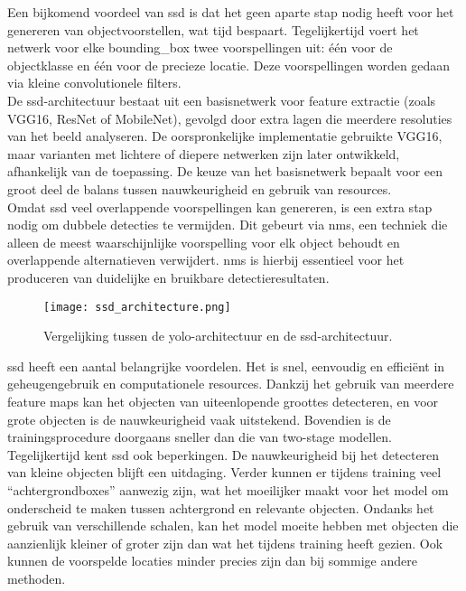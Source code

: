 Een bijkomend voordeel van \gls{ssd} is dat het geen aparte stap nodig heeft voor het genereren van objectvoorstellen, wat tijd bespaart. Tegelijkertijd voert het netwerk voor elke \gls{bounding_box} twee voorspellingen uit: één voor de objectklasse en één voor de precieze locatie. Deze voorspellingen worden gedaan via kleine convolutionele filters. \\

De \gls{ssd}-architectuur bestaat uit een basisnetwerk voor feature extractie (zoals VGG16, ResNet of MobileNet), gevolgd door extra lagen die meerdere resoluties van het beeld analyseren. De oorspronkelijke implementatie gebruikte VGG16, maar varianten met lichtere of diepere netwerken zijn later ontwikkeld, afhankelijk van de toepassing. De keuze van het basisnetwerk bepaalt voor een groot deel de balans tussen nauwkeurigheid en gebruik van resources. \\

Omdat \gls{ssd} veel overlappende voorspellingen kan genereren, is een extra stap nodig om dubbele detecties te vermijden. Dit gebeurt via \gls{nms}, een techniek die alleen de meest waarschijnlijke voorspelling voor elk object behoudt en overlappende alternatieven verwijdert. \gls{nms} is hierbij essentieel voor het produceren van duidelijke en bruikbare detectieresultaten.

\begin{figure}[H]
    \centering
    \texttt{[image: ssd\_architecture.png]}
    \caption[Vergelijking YOLO- en SSD-architectuur.]{\label{fig:ssd_architecture}Vergelijking tussen de \gls{yolo}-architectuur en de \gls{ssd}-architectuur. \autocite{Liu_2016}}
\end{figure}

\gls{ssd} heeft een aantal belangrijke voordelen. Het is snel, eenvoudig en efficiënt in geheugengebruik en computationele resources. Dankzij het gebruik van meerdere feature maps kan het objecten van uiteenlopende groottes detecteren, en voor grote objecten is de nauwkeurigheid vaak uitstekend. Bovendien is de trainingsprocedure doorgaans sneller dan die van two-stage modellen. \\

Tegelijkertijd kent \gls{ssd} ook beperkingen. De nauwkeurigheid bij het detecteren van kleine objecten blijft een uitdaging. Verder kunnen er tijdens training veel ``achtergrondboxes'' aanwezig zijn, wat het moeilijker maakt voor het model om onderscheid te maken tussen achtergrond en relevante objecten. Ondanks het gebruik van verschillende schalen, kan het model moeite hebben met objecten die aanzienlijk kleiner of groter zijn dan wat het tijdens training heeft gezien. Ook kunnen de voorspelde locaties minder precies zijn dan bij sommige andere methoden.

